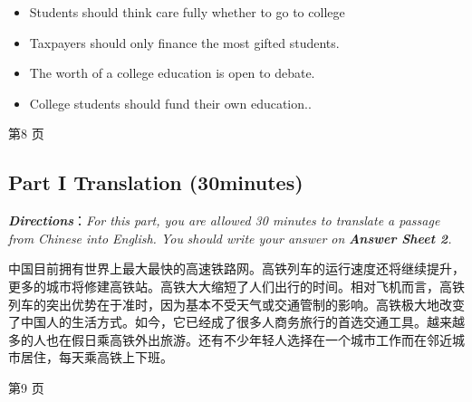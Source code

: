 \documentclass[UTF8,11pt]{ctexart}
\begin{document}
\begin{itemize}[leftmargin=2em,itemsep=.2em,topsep=.4em]\item[A.] Students should think care fully whether to go to college
\item[B.] Taxpayers should only finance the most gifted students.
\item[C.] The worth of a college education is open to debate.
\item[D.] College students should fund their own education..
\end{itemize}

第8 页


\subsection*{\textbf{Part I} \textbf{Translation} \textbf{(30minutes)}}


\textbf{\textit{Directions}}：\textit{For this part, you are allowed 30 minutes to translate a passage from Chinese into English. You} \textit{should write your answer on}\textbf{\textit{ Answer Sheet 2}}\textit{.}


中国目前拥有世界上最大最快的高速铁路网。高铁列车的运行速度还将继续提升，更多的城市将修建高铁站。高铁大大缩短了人们出行的时间。相对飞机而言，高铁列车的突出优势在于准时，因为基本不受天气或交通管制的影响。高铁极大地改变了中国人的生活方式。如今，它已经成了很多人商务旅行的首选交通工具。越来越多的人也在假日乘高铁外出旅游。还有不少年轻人选择在一个城市工作而在邻近城市居住，每天乘高铁上下班。


第9 页
\end{document}
